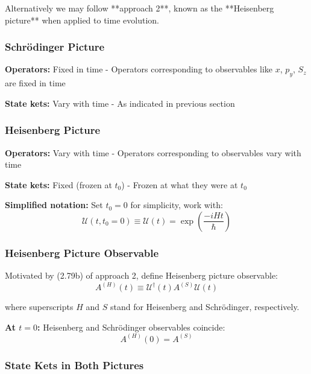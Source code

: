 \documentclass[11pt,a4paper]{article}
\begin{document}
Alternatively we may follow **approach 2**, known as the **Heisenberg picture** when applied to time evolution.

\subsubsection{Schrödinger Picture}

\textbf{Operators:} Fixed in time
- Operators corresponding to observables like $x$, $p_y$, $S_z$ are fixed in time

\textbf{State kets:} Vary with time
- As indicated in previous section

\subsubsection{Heisenberg Picture}

\textbf{Operators:} Vary with time
- Operators corresponding to observables vary with time

\textbf{State kets:} Fixed (frozen at $t_0$)
- Frozen at what they were at $t_0$

\textbf{Simplified notation:} Set $t_0 = 0$ for simplicity, work with:
\begin{equation}
\mathscr{U}(t, t_0 = 0) \equiv \mathscr{U}(t) = \exp\left(\frac{-iHt}{\hbar}\right)
\tag{2.83}
\end{equation}

\subsubsection{Heisenberg Picture Observable}

Motivated by (2.79b) of approach 2, define Heisenberg picture observable:
\begin{equation}
\boxed{A^{(H)}(t) \equiv \mathscr{U}^\dagger(t)A^{(S)}\mathscr{U}(t)}
\tag{2.84}
\end{equation}

where superscripts $H$ and $S$ stand for Heisenberg and Schrödinger, respectively.

\textbf{At $t = 0$:} Heisenberg and Schrödinger observables coincide:
\begin{equation}
A^{(H)}(0) = A^{(S)}
\tag{2.85}
\end{equation}

\subsubsection{State Kets in Both Pictures}
\end{document}
